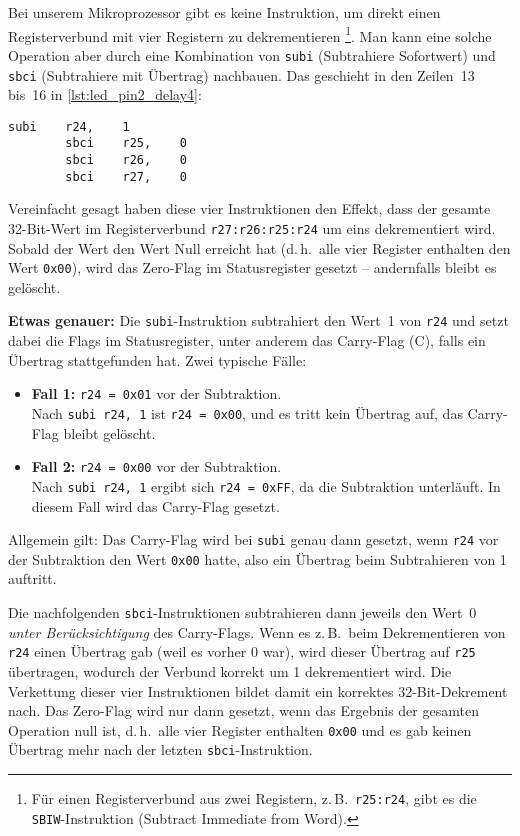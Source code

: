 \documentclass[a4paper,12pt]{article}
\begin{document}
\noindent
Bei unserem Mikroprozessor gibt es keine Instruktion, um direkt einen
Registerverbund mit vier Registern zu dekrementieren%
\footnote{Für einen Registerverbund aus zwei Registern,
z.\,B.\ \texttt{r25:r24}, gibt es die \texttt{SBIW}-Instruktion
(Subtract Immediate from Word).}. 
Man kann eine solche Operation aber durch eine Kombination von \texttt{subi}
(Subtrahiere Sofortwert) und \texttt{sbci} (Subtrahiere mit Übertrag)
nachbauen. Das geschieht in den Zeilen~13 bis~16
in \autoref{lst:led_pin2_delay4}:

\begin{lstlisting}[language={},numbers=none]
        subi    r24,    1
        sbci    r25,    0
        sbci    r26,    0
        sbci    r27,    0
\end{lstlisting}

\noindent
Vereinfacht gesagt haben diese vier Instruktionen den Effekt, dass der gesamte
32-Bit-Wert im Registerverbund \texttt{r27:r26:r25:r24} um eins dekrementiert
wird. Sobald der Wert den Wert Null erreicht hat (d.\,h.\ alle vier Register
enthalten den Wert \texttt{0x00}), wird das Zero-Flag im Statusregister gesetzt
– andernfalls bleibt es gelöscht.

\vspace{1em}
\noindent
\textbf{Etwas genauer:} Die \texttt{subi}-Instruktion subtrahiert
den Wert~1 von \texttt{r24} und setzt dabei die Flags im Statusregister, unter
anderem das Carry-Flag (C), falls ein Übertrag stattgefunden hat. Zwei typische
Fälle:
\begin{itemize}
    \item
	\textbf{Fall 1:} \texttt{r24 = 0x01} vor der Subtraktion.\\
	Nach \texttt{subi r24, 1} ist \texttt{r24 = 0x00}, und es tritt kein
	Übertrag auf, das Carry-Flag bleibt gelöscht.
    \item
	\textbf{Fall 2:} \texttt{r24 = 0x00} vor der Subtraktion.\\
	Nach \texttt{subi r24, 1} ergibt sich \texttt{r24 = 0xFF}, da die
	Subtraktion unterläuft. In diesem Fall wird das Carry-Flag gesetzt.
\end{itemize}
Allgemein gilt: Das Carry-Flag wird bei \texttt{subi} genau dann gesetzt, wenn
\texttt{r24} vor der Subtraktion den Wert \texttt{0x00} hatte, also ein
Übertrag beim Subtrahieren von 1 auftritt.

Die nachfolgenden \texttt{sbci}-Instruktionen subtrahieren dann jeweils den
Wert~0 \emph{unter Berücksichtigung} des Carry-Flags. Wenn es z.\,B.\ beim
Dekrementieren von \texttt{r24} einen Übertrag gab (weil es vorher 0 war), wird
dieser Übertrag auf \texttt{r25} übertragen, wodurch der Verbund korrekt um 1
dekrementiert wird. Die Verkettung dieser vier Instruktionen bildet damit ein
korrektes 32-Bit-Dekrement nach.
Das Zero-Flag wird nur dann gesetzt, wenn das Ergebnis der gesamten Operation
null ist, d.\,h.\ alle vier Register enthalten \texttt{0x00} und es gab keinen
Übertrag mehr nach der letzten \texttt{sbci}-Instruktion.
\end{document}

